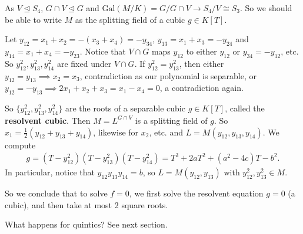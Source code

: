 \documentclass{article}
\theoremstyle{definition}
\begin{document}
\begin{figure}[H]
    \centering
\end{figure}
As $V \trianglelefteq S_4$, $G \cap V \trianglelefteq G$ and $\text{Gal}(M/K) = G/G \cap V \to S_4/V \cong S_3$. So we should be able to write $M$ as the splitting field of a cubic $g \in K[T]$.
\vspace{1mm}

Let $y_{12}= x_1+x_2=-(x_3+x_4)=-y_{34}$, $y_{13}=x_1+x_3=-y_{24}$ and $y_{14}=x_1+x_4=-y_{23}$. Notice that $V \cap G$ maps $y_{12}$ to either $y_{12}$ or $y_{34} = -y_{12}$, etc. So $y_{12}^2, y_{13}^2, y_{14}^2$ are fixed under $V \cap G$. If $y_{12}^2=y_{13}^2$, then either $y_{12}=y_{13} \implies x_2=x_3$, contradiction as our polynomial is separable, or $y_{12}=-y_{13} \implies 2x_1+x_2+x_3=x_1-x_4 = 0$, a contradiction again.
\vspace{1mm}

So $\{y_{12}^2,y_{13}^2,y_{14}^2\}$ are the roots of a separable cubic $g \in K[T]$, called the \textbf{resolvent cubic}. Then $M=L^{G \cap V}$ is a splitting field of $g$. So $x_1 = \frac{1}{2}(y_{12}+y_{13}+y_{14})$, likewise for $x_2$, etc. and $L=M(y_{12},y_{13},y_{14})$. We compute 
\begin{align*}
    g = (T-y_{12}^2)(T-y_{13}^2)(T-y_{14}^2) = T^3 + 2aT^2 + (a^2-4c) T -b^2.
\end{align*}
In particular, notice that $y_{12}y_{13}y_{14}=b$, so $L=M(y_{12},y_{13})$ with $y_{12}^2, y_{13}^2 \in M$.
\vspace{1mm}

So we conclude that to solve $f=0$, we first solve the resolvent equation $g=0$ (a cubic), and then take at most 2 square roots.
\vspace{1mm}

What happens for quintics? See next section.
\end{document}
